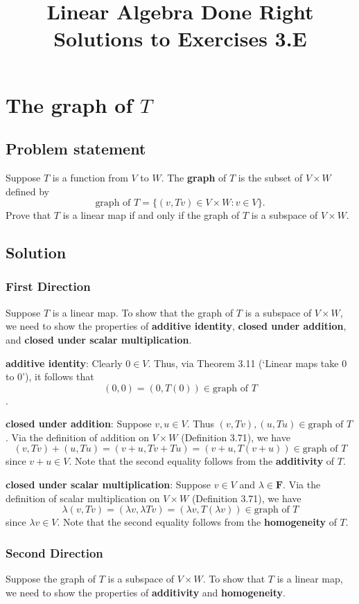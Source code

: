 \documentclass{article}
\title{Linear Algebra Done Right\\Solutions to Exercises 3.E}
\author{}
\date{}
\begin{document}
\maketitle

\section{The graph of $T$}
\subsection*{Problem statement}
Suppose $T$ is a function from $V$ to $W$. 
The \textbf{graph} of $T$ is the subset of $V\times W$ defined by
\[\text{graph of }T=\{(v,Tv)\in V\times W : v\in V\}.\]
Prove that $T$ is a linear map if and only if the graph of $T$ is a subspace of $V\times W$.

\subsection*{Solution}
\subsubsection*{First Direction}
Suppose $T$ is a linear map. 
To show that the graph of $T$ is a subspace of $V\times W$, we need to show the properties of \textbf{additive identity}, \textbf{closed under addition}, and \textbf{closed under scalar multiplication}.

\textbf{additive identity}: Clearly $0\in V$. 
Thus, via Theorem 3.11 (`Linear maps take $0$ to $0$'), it follows that
\[(0,0)=(0,T(0))\in \text{graph of }T\].

\textbf{closed under addition}: Suppose $v,u\in V$. 
Thus \newline $(v,Tv),(u,Tu)\in \text{graph of }T$. 
Via the definition of addition on $V\times W$ (Definition 3.71), we have 
\[(v,Tv)+(u,Tu)=(v+u,Tv+Tu)=(v+u,T(v+u))\in\text{graph of }T\]
since $v+u\in V$. 
Note that the second equality follows from the \textbf{additivity} of $T$.

\textbf{closed under scalar multiplication}: Suppose $v\in V$ and $\lambda\in \textbf{F}$. 
Via the definition of scalar multiplication on $V\times W$ (Definition 3.71), we have
\[\lambda(v,Tv)=(\lambda v,\lambda Tv)=(\lambda v,T(\lambda v))\in\text{graph of }T\]
since $\lambda v\in V$. 
Note that the second equality follows from the \textbf{homogeneity} of $T$.

\subsubsection*{Second Direction}
Suppose the graph of $T$ is a subspace of $V\times W$. 
To show that $T$ is a linear map, we need to show the properties of \textbf{additivity} and \textbf{homogeneity}.
\end{document}
